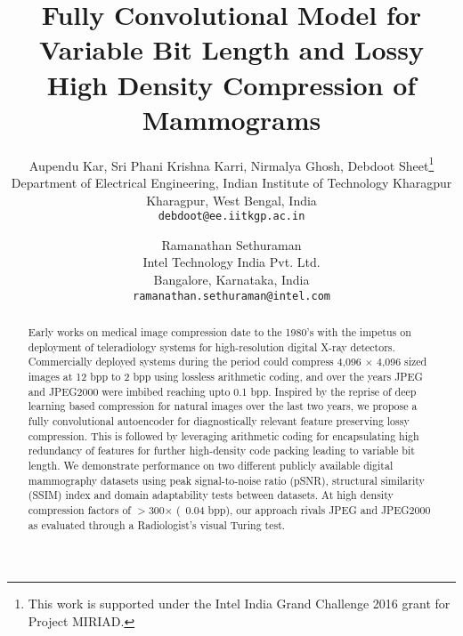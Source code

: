 \documentclass[10pt,twocolumn,letterpaper]{article}
\begin{document}
\title{Fully Convolutional Model for Variable Bit Length and Lossy High Density Compression of Mammograms}

\author{Aupendu Kar, Sri Phani Krishna Karri, Nirmalya Ghosh, Debdoot Sheet\thanks{This work is supported under the Intel India Grand Challenge 2016 grant for Project MIRIAD.}\\
Department of Electrical Engineering, Indian Institute of Technology Kharagpur\\
Kharagpur, West Bengal, India\\
{\tt\small debdoot@ee.iitkgp.ac.in}
\and
Ramanathan Sethuraman\\
Intel Technology India Pvt. Ltd.\\
Bangalore, Karnataka, India\\
{\tt\small ramanathan.sethuraman@intel.com}
}

\maketitle

\begin{abstract}

Early works on medical image compression date to the 1980's with the impetus on deployment of teleradiology systems for high-resolution digital X-ray detectors. Commercially deployed systems during the period could compress 4,096 $\times$ 4,096 sized images at 12 bpp to 2 bpp using lossless arithmetic coding, and over the years JPEG and JPEG2000 were imbibed reaching upto 0.1 bpp. Inspired by the reprise of deep learning based compression for natural images over the last two years, we propose a fully convolutional autoencoder for diagnostically relevant feature preserving lossy compression. This is followed by leveraging arithmetic coding for encapsulating high redundancy of features for further high-density code packing leading to variable bit length. We demonstrate performance on two different publicly available digital mammography datasets using peak signal-to-noise ratio (pSNR), structural similarity (SSIM) index and domain adaptability tests between datasets. At high density compression factors of $>$300$\times$ (~0.04 bpp), our approach rivals JPEG and JPEG2000 as evaluated through a Radiologist's visual Turing test.

\end{abstract}
\end{document}
